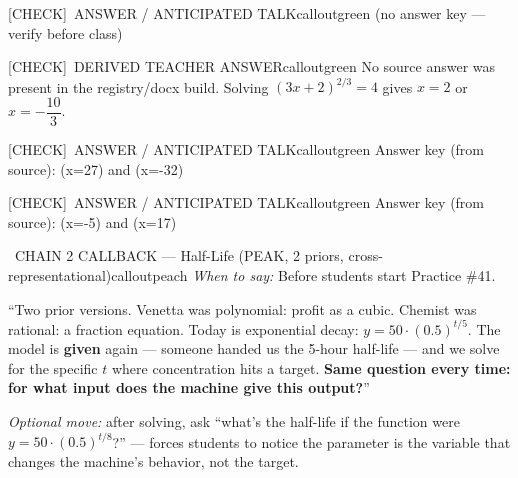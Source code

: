 \documentclass[11pt]{article}
\newcommand{\IconCheck}{[CHECK]}
\newcommand{\teacheranswerbox}[2]{%
  \begin{callout}{#1}{calloutgreen}
  #2
  \end{callout}
}
\begin{document}

\begin{callout}{\IconCheck\ ANSWER / ANTICIPATED TALK}{calloutgreen}
(no answer key — verify before class)
\end{callout}

\teacheranswerbox{\IconCheck\ DERIVED TEACHER ANSWER}{%
No source answer was present in the registry/docx build. Solving \((3x + 2)^{2/3} = 4\) gives \(x = 2\) or \(x = -\dfrac{10}{3}\).
}


\begin{callout}{\IconCheck\ ANSWER / ANTICIPATED TALK}{calloutgreen}
Answer key (from source): (x=27) and (x=-32)
\end{callout}


\begin{callout}{\IconCheck\ ANSWER / ANTICIPATED TALK}{calloutgreen}
Answer key (from source): (x=-5) and (x=17)
\end{callout}

\begin{callout}{\IconSpeak\ CHAIN 2 CALLBACK --- Half-Life (PEAK, 2 priors, cross-representational)}{calloutpeach}
\textit{When to say:} Before students start Practice \#41.

\smallskip
``Two prior versions. Venetta was polynomial: profit as a cubic. Chemist was rational: a fraction equation. Today is exponential decay: \(y = 50\cdot(0.5)^{t/5}\). The model is \textbf{given} again --- someone handed us the 5-hour half-life --- and we solve for the specific \(t\) where concentration hits a target. \textbf{Same question every time: for what input does the machine give this output?}''

\smallskip
\textit{Optional move:} after solving, ask ``what's the half-life if the function were \(y = 50\cdot(0.5)^{t/8}\)?'' --- forces students to notice the parameter is the variable that changes the machine's behavior, not the target.
\end{callout}

\end{document}
